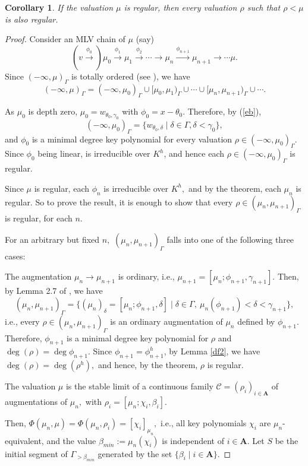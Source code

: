 \documentclass[11pt]{amsart}
\newtheorem{corollary}[theorem]{Corollary}
\theoremstyle{definition}
\theoremstyle{remark}
\numberwithin{equation}{section}
\begin{document}
	\begin{corollary}
		If the valuation $\mu$ is regular, then every valuation $\rho$ such that $\rho<\mu$ is also regular.
	\end{corollary}
	\begin{proof}
		Consider an MLV chain of $\mu$ (say) \[(v\xrightarrow{\phi_0})\mu_0\xrightarrow{\phi_1}\mu_1\xrightarrow{\phi_2}\cdots \longrightarrow \mu_{n}\xrightarrow{\phi_{n+1}} \mu_{n+1}\longrightarrow\cdots \mu.\] Since $(-\infty,\mu)_\Gamma$ is totally ordered (see \cite[Theorem 2.4]{EN1}), we have 
		\[(-\infty,\mu)_\Gamma=(-\infty,\mu_0)_\Gamma\cup[\mu_0,\mu_1)_\Gamma\cup\cdots\cup[\mu_n,\mu_{n+1})_\Gamma\cup\cdots.\] 
		
		As $\mu_0$ is depth zero, $\mu_0=w_{\theta_0,\gamma_0}$ with $\phi_0=x-\theta_0$. Therefore, by (\ref{eb}), \[(-\infty,\mu_0)_\Gamma=\{w_{\theta_0,\delta}\mid \delta\in\Gamma,\delta<\gamma_0\},\] and $\phi_0$ is a minimal degree key polynomial for every valuation $\rho\in(-\infty,\mu_0)_\Gamma.$ Since $\phi_0$ being linear, is irreducible over $K^h$, and hence each $\rho\in(-\infty,\mu_0)_\Gamma$ is regular. 
		
		Since $\mu$ is regular, each $\phi_n$ is irreducible over $K^h,$ and by the theorem, each $\mu_n$ is regular. So to prove the result, it is enough to show that every $\rho\in(\mu_n,\mu_{n+1})_\Gamma$ is regular, for each $n.$ 
		
		For an arbitrary but fixed $n,$ $(\mu_n,\mu_{n+1})_\Gamma$ falls into one of the following three cases:
		
			\smallskip
		 The augmentation $\mu_n\longrightarrow \mu_{n+1}$ is ordinary, i.e., $\mu_{n+1}=[\mu_n;\phi_{n+1},\gamma_{n+1}].$ Then, by Lemma 2.7 of \cite{EN1}, we have 
		\[(\mu_n,\mu_{n+1})_\Gamma=\{(\mu_n)_\delta=[\mu_n;\phi_{n+1},\delta]\mid\delta\in\Gamma,\ \mu_n(\phi_{n+1})<\delta<\gamma_{n+1}\},\] i.e., every $\rho\in(\mu_n,\mu_{n+1})_\Gamma$ is an ordinary augmentation of $\mu_n$ defined by $\phi_{n+1}$. Therefore, $\phi_{n+1}$ is a minimal degree key polynomial for $\rho$ and $\deg(\rho)=\deg\phi_{n+1}.$ Since $\phi_{n+1}=\phi_{n+1}^h$, by Lemma \ref{df2}, we have $\deg(\rho)=\deg(\rho^h),$ and hence, by the theorem, $\rho$ is regular.
		
		\smallskip
		  The valuation $\mu$ is the stable limit of a continuous family $\mathcal{C}=(\rho_i)_{i\in\mathbf{A}}$ of augmentations of $\mu_n,$ with $\rho_i=[\mu_n;\chi_i,\beta_i]$.
		
		 \noindent Then, $\Phi(\mu_n,\mu)=\Phi(\mu_n,\rho_i)=[\chi_i]_{\mu_n},$ i.e., all key polynomials $\chi_i$ are $\mu_n$-equivalent, and the value $\beta_{min}:=\mu_n(\chi_i)$ is independent of $i\in\mathbf{A}$. Let $S$ be the initial segment of $\Gamma_{>\beta_{min}}$ generated by the set $\{\beta_i\mid i\in\mathbf{A}\}.$
		

\end{proof}
\end{document}
